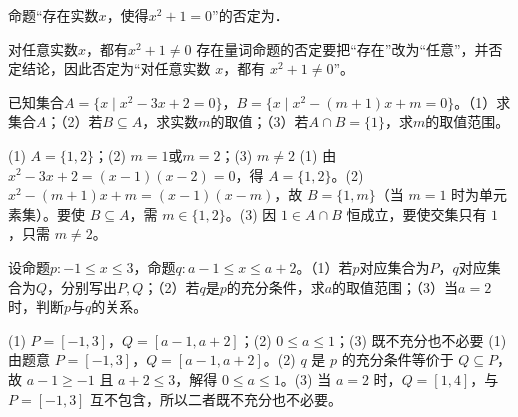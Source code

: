 \begin{question}[GPT生成]
命题“存在实数$x$，使得$x^2+1=0$”的否定为\blank{4cm}．
\end{question}
\begin{answer}{对任意实数$x$，都有$x^2+1\ne0$}
存在量词命题的否定要把“存在”改为“任意”，并否定结论，因此否定为“对任意实数 $x$，都有 $x^2+1\ne0$”。
\end{answer}



\begin{question}[GPT生成]
已知集合$A=\{x\mid x^2-3x+2=0\}$，$B=\{x\mid x^2-(m+1)x+m=0\}$。（1）求集合$A$；（2）若$B\subseteq A$，求实数$m$的取值；（3）若$A\cap B=\{1\}$，求$m$的取值范围。
\end{question}
\solutionSpace{5cm}
\begin{answer}{(1) $A=\{1,2\}$；(2) $m=1$或$m=2$；(3) $m\ne2$}
(1) 由 $x^2-3x+2=(x-1)(x-2)=0$，得 $A=\{1,2\}$。(2) $x^2-(m+1)x+m=(x-1)(x-m)$，故 $B=\{1,m\}$（当 $m=1$ 时为单元素集）。要使 $B\subseteq A$，需 $m\in\{1,2\}$。(3) 因 $1\in A\cap B$ 恒成立，要使交集只有 $1$，只需 $m\ne2$。
\end{answer}

\begin{question}[GPT生成]
设命题$p:-1\le x\le3$，命题$q:a-1\le x\le a+2$。（1）若$p$对应集合为$P$，$q$对应集合为$Q$，分别写出$P,Q$；（2）若$q$是$p$的充分条件，求$a$的取值范围；（3）当$a=2$时，判断$p$与$q$的关系。
\end{question}
\solutionSpace{5cm}
\begin{answer}{(1) $P=[-1,3]$，$Q=[a-1,a+2]$；(2) $0\le a\le1$；(3) 既不充分也不必要}
(1) 由题意 $P=[-1,3]$，$Q=[a-1,a+2]$。(2) $q$ 是 $p$ 的充分条件等价于 $Q\subseteq P$，故 $a-1\ge-1$ 且 $a+2\le3$，解得 $0\le a\le1$。(3) 当 $a=2$ 时，$Q=[1,4]$，与 $P=[-1,3]$ 互不包含，所以二者既不充分也不必要。
\end{answer}

\printChapterAnswers
